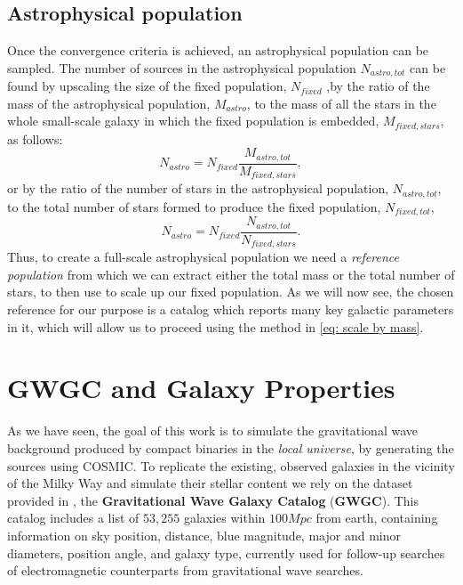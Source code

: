 \subsection{Astrophysical population}
Once the convergence criteria is achieved, an astrophysical population can be sampled. 
The number of sources in the astrophysical population $N_{astro, tot}$ can be found by upscaling the size of the fixed population, $N_{fixed}$ ,by the ratio of the mass of the astrophysical population, $M_{astro}$, to the mass of all the stars in the whole small-scale galaxy in which the fixed population is embedded, $M_{fixed,stars}$, as follows:
\begin{equation}
    N_{astro} = N_{fixed}\frac{M_{astro, tot}}{M_{fixed, stars}},
    \label{eq: scale by mass}
\end{equation}
or by the ratio of the number of stars in the astrophysical
population, $N_{astro, tot}$, to the total number of stars formed to produce the fixed population, $N_{fixed,tot}$,
\begin{equation}
    N_{astro} = N_{fixed}\frac{N_{astro, tot}}{N_{fixed, stars}}.
    \label{eq: scale by number}
\end{equation}
Thus, to create a full-scale astrophysical population we need a \textit{reference population} from which we can extract either the total mass or the total number of stars, to then use to scale up our fixed population.
As we will now see, the chosen reference for our purpose is a catalog which reports many key galactic parameters in it, which will allow us to proceed using the method in \eqref{eq: scale by mass}.



\section{GWGC and Galaxy Properties}
As we have seen, the goal of this work is to simulate the gravitational wave background produced by compact binaries in the \textit{local universe}, by generating the sources using COSMIC.
To replicate the existing, observed galaxies in the vicinity of the Milky Way and simulate their stellar content we rely on the dataset provided in \cite{GWGC}, the \textbf{Gravitational Wave Galaxy Catalog} (\textbf{GWGC}).
This catalog includes a list of $53,255$ galaxies within $100Mpc$ from earth, containing information on sky position, distance, blue magnitude, major and minor diameters, position angle, and galaxy type, currently used for follow-up searches of electromagnetic counterparts from gravitational wave searches.

